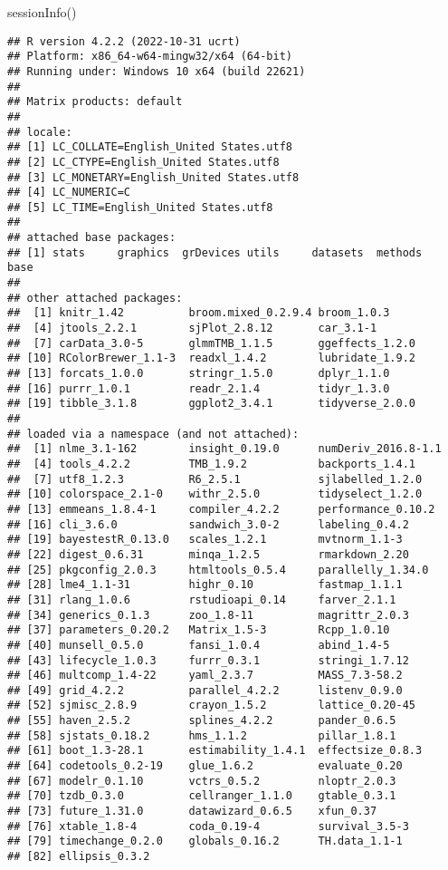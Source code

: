 \documentclass[
]{article}
\newenvironment{Shaded}{\begin{snugshade}}{\end{snugshade}}
\newcommand{\FunctionTok}[1]{\textcolor[rgb]{0.00,0.00,0.00}{#1}}
\newcommand{\NormalTok}[1]{#1}
\begin{document}
\begin{Shaded}
\begin{Highlighting}[]
\FunctionTok{sessionInfo}\NormalTok{()}
\end{Highlighting}
\end{Shaded}

\begin{verbatim}
## R version 4.2.2 (2022-10-31 ucrt)
## Platform: x86_64-w64-mingw32/x64 (64-bit)
## Running under: Windows 10 x64 (build 22621)
## 
## Matrix products: default
## 
## locale:
## [1] LC_COLLATE=English_United States.utf8 
## [2] LC_CTYPE=English_United States.utf8   
## [3] LC_MONETARY=English_United States.utf8
## [4] LC_NUMERIC=C                          
## [5] LC_TIME=English_United States.utf8    
## 
## attached base packages:
## [1] stats     graphics  grDevices utils     datasets  methods   base     
## 
## other attached packages:
##  [1] knitr_1.42          broom.mixed_0.2.9.4 broom_1.0.3        
##  [4] jtools_2.2.1        sjPlot_2.8.12       car_3.1-1          
##  [7] carData_3.0-5       glmmTMB_1.1.5       ggeffects_1.2.0    
## [10] RColorBrewer_1.1-3  readxl_1.4.2        lubridate_1.9.2    
## [13] forcats_1.0.0       stringr_1.5.0       dplyr_1.1.0        
## [16] purrr_1.0.1         readr_2.1.4         tidyr_1.3.0        
## [19] tibble_3.1.8        ggplot2_3.4.1       tidyverse_2.0.0    
## 
## loaded via a namespace (and not attached):
##  [1] nlme_3.1-162        insight_0.19.0      numDeriv_2016.8-1.1
##  [4] tools_4.2.2         TMB_1.9.2           backports_1.4.1    
##  [7] utf8_1.2.3          R6_2.5.1            sjlabelled_1.2.0   
## [10] colorspace_2.1-0    withr_2.5.0         tidyselect_1.2.0   
## [13] emmeans_1.8.4-1     compiler_4.2.2      performance_0.10.2 
## [16] cli_3.6.0           sandwich_3.0-2      labeling_0.4.2     
## [19] bayestestR_0.13.0   scales_1.2.1        mvtnorm_1.1-3      
## [22] digest_0.6.31       minqa_1.2.5         rmarkdown_2.20     
## [25] pkgconfig_2.0.3     htmltools_0.5.4     parallelly_1.34.0  
## [28] lme4_1.1-31         highr_0.10          fastmap_1.1.1      
## [31] rlang_1.0.6         rstudioapi_0.14     farver_2.1.1       
## [34] generics_0.1.3      zoo_1.8-11          magrittr_2.0.3     
## [37] parameters_0.20.2   Matrix_1.5-3        Rcpp_1.0.10        
## [40] munsell_0.5.0       fansi_1.0.4         abind_1.4-5        
## [43] lifecycle_1.0.3     furrr_0.3.1         stringi_1.7.12     
## [46] multcomp_1.4-22     yaml_2.3.7          MASS_7.3-58.2      
## [49] grid_4.2.2          parallel_4.2.2      listenv_0.9.0      
## [52] sjmisc_2.8.9        crayon_1.5.2        lattice_0.20-45    
## [55] haven_2.5.2         splines_4.2.2       pander_0.6.5       
## [58] sjstats_0.18.2      hms_1.1.2           pillar_1.8.1       
## [61] boot_1.3-28.1       estimability_1.4.1  effectsize_0.8.3   
## [64] codetools_0.2-19    glue_1.6.2          evaluate_0.20      
## [67] modelr_0.1.10       vctrs_0.5.2         nloptr_2.0.3       
## [70] tzdb_0.3.0          cellranger_1.1.0    gtable_0.3.1       
## [73] future_1.31.0       datawizard_0.6.5    xfun_0.37          
## [76] xtable_1.8-4        coda_0.19-4         survival_3.5-3     
## [79] timechange_0.2.0    globals_0.16.2      TH.data_1.1-1      
## [82] ellipsis_0.3.2
\end{verbatim}
\end{document}
